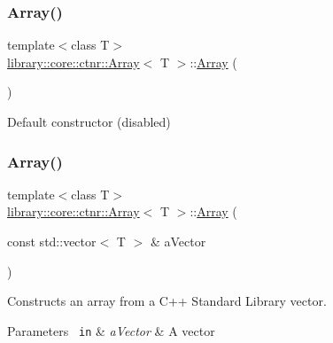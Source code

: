 \subsubsection{\texorpdfstring{Array()}{Array()}\hspace{0.1cm}{\footnotesize\ttfamily [1/8]}}
{\footnotesize\ttfamily template$<$class T$>$ \\
\mbox{\hyperlink{classlibrary_1_1core_1_1ctnr_1_1_array}{library\+::core\+::ctnr\+::\+Array}}$<$ T $>$\+::\mbox{\hyperlink{classlibrary_1_1core_1_1ctnr_1_1_array}{Array}} (\begin{DoxyParamCaption}{ }\end{DoxyParamCaption})\hspace{0.3cm}{\ttfamily [delete]}}



Default constructor (disabled) 

\mbox{\label{classlibrary_1_1core_1_1ctnr_1_1_array_a9b510b4e2a3f9d4a324dfd0feba01285}} 
\subsubsection{\texorpdfstring{Array()}{Array()}\hspace{0.1cm}{\footnotesize\ttfamily [2/8]}}
{\footnotesize\ttfamily template$<$class T$>$ \\
\mbox{\hyperlink{classlibrary_1_1core_1_1ctnr_1_1_array}{library\+::core\+::ctnr\+::\+Array}}$<$ T $>$\+::\mbox{\hyperlink{classlibrary_1_1core_1_1ctnr_1_1_array}{Array}} (\begin{DoxyParamCaption}\item[{const std\+::vector$<$ T $>$ \&}]{a\+Vector }\end{DoxyParamCaption})}



Constructs an array from a C++ Standard Library vector. 


\begin{DoxyCode}{0}
\end{DoxyCode}



\begin{DoxyParams}[1]{Parameters}
\mbox{\texttt{ in}}  & {\em a\+Vector} & A vector \\
\hline
\end{DoxyParams}
\mbox{\label{classlibrary_1_1core_1_1ctnr_1_1_array_a647190cec3e259a8d8ad173c18bf3020}} 
